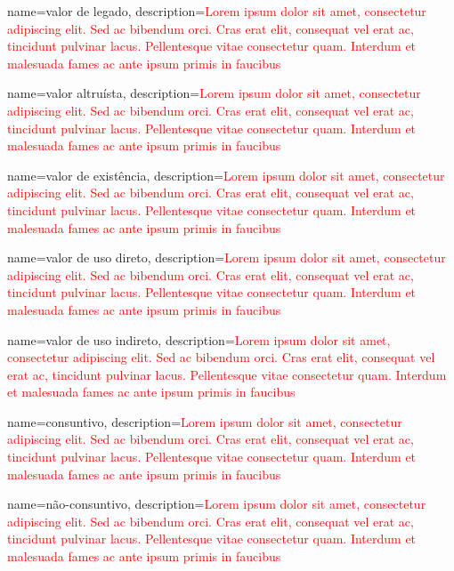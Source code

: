 {
	name=valor de legado,
	description={\textcolor{red}{Lorem ipsum dolor sit amet, consectetur adipiscing elit. Sed ac bibendum orci. Cras erat elit, consequat vel erat ac, tincidunt pulvinar lacus. Pellentesque vitae consectetur quam. Interdum et malesuada fames ac ante ipsum primis in faucibus}}
}

{
	name=valor altruísta,
	description={\textcolor{red}{Lorem ipsum dolor sit amet, consectetur adipiscing elit. Sed ac bibendum orci. Cras erat elit, consequat vel erat ac, tincidunt pulvinar lacus. Pellentesque vitae consectetur quam. Interdum et malesuada fames ac ante ipsum primis in faucibus}}
}

{
	name=valor de existência,
	description={\textcolor{red}{Lorem ipsum dolor sit amet, consectetur adipiscing elit. Sed ac bibendum orci. Cras erat elit, consequat vel erat ac, tincidunt pulvinar lacus. Pellentesque vitae consectetur quam. Interdum et malesuada fames ac ante ipsum primis in faucibus}}
}

{
	name=valor de uso direto,
	description={\textcolor{red}{Lorem ipsum dolor sit amet, consectetur adipiscing elit. Sed ac bibendum orci. Cras erat elit, consequat vel erat ac, tincidunt pulvinar lacus. Pellentesque vitae consectetur quam. Interdum et malesuada fames ac ante ipsum primis in faucibus}}
}

{
	name=valor de uso indireto,
	description={\textcolor{red}{Lorem ipsum dolor sit amet, consectetur adipiscing elit. Sed ac bibendum orci. Cras erat elit, consequat vel erat ac, tincidunt pulvinar lacus. Pellentesque vitae consectetur quam. Interdum et malesuada fames ac ante ipsum primis in faucibus}}
}

{
	name=consuntivo,
	description={\textcolor{red}{Lorem ipsum dolor sit amet, consectetur adipiscing elit. Sed ac bibendum orci. Cras erat elit, consequat vel erat ac, tincidunt pulvinar lacus. Pellentesque vitae consectetur quam. Interdum et malesuada fames ac ante ipsum primis in faucibus}}
}

{
	name=não-consuntivo,
	description={\textcolor{red}{Lorem ipsum dolor sit amet, consectetur adipiscing elit. Sed ac bibendum orci. Cras erat elit, consequat vel erat ac, tincidunt pulvinar lacus. Pellentesque vitae consectetur quam. Interdum et malesuada fames ac ante ipsum primis in faucibus}}
}

